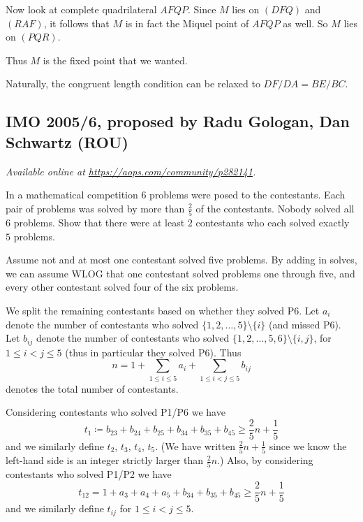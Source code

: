 \documentclass[11pt]{scrartcl}
\begin{document}
Now look at complete quadrilateral $AFQP$.
Since $M$ lies on $(DFQ)$ and $(RAF)$,
it follows that $M$ is in fact the Miquel point of $AFQP$ as well.
So $M$ lies on $(PQR)$.

Thus $M$ is the fixed point that we wanted.

\begin{remark*}
  Naturally, the congruent length
  condition can be relaxed to $DF/DA = BE/BC$.
\end{remark*}
\pagebreak

\subsection{IMO 2005/6, proposed by Radu Gologan, Dan Schwartz (ROU)}
\textsl{Available online at \url{https://aops.com/community/p282141}.}
\begin{mdframed}[style=mdpurplebox,frametitle={Problem statement}]
In a mathematical competition $6$ problems were posed to the contestants.
Each pair of problems was solved by more than $\frac{2}{5}$ of the contestants.
Nobody solved all 6 problems.
Show that there were at least $2$ contestants
who each solved exactly $5$ problems.
\end{mdframed}
Assume not and at most one contestant solved five problems.
By adding in solves,
we can assume WLOG that one contestant solved problems one through five,
and every other contestant solved four of the six problems.

We split the remaining contestants based on whether they solved P6.
Let $a_i$ denote the number of contestants who solved
$\{1,2,\dots,5\} \setminus \{i\}$ (and missed P6).
Let $b_{ij}$ denote the number of contestants who solved
$\{1,2,\dots,5,6\} \setminus \{i,j\}$, for $1 \le i < j \le 5$
(thus in particular they solved P6).
Thus
\[ n = 1 + \sum_{1 \le i \le 5} a_i + \sum_{1 \le i < j \le 5} b_{ij} \]
denotes the total number of contestants.

Considering contestants who solved P1/P6 we have
\[ t_1 \coloneqq b_{23} + b_{24} + b_{25} + b_{34} + b_{35} + b_{45} \ge \frac25n + \frac15 \]
and we similarly define $t_2$, $t_3$, $t_4$, $t_5$.
(We have written $\frac25n+\frac15$ since we know
the left-hand side is an integer strictly larger than $\frac25n$.)
Also, by considering contestants who solved P1/P2 we have
\[ t_{12} = 1 + a_{3} + a_{4} + a_{5} + b_{34} + b_{35} + b_{45}
  \ge \frac25n + \frac15 \]
and we similarly define $t_{ij}$ for $1 \le i < j \le 5$.
\end{document}
